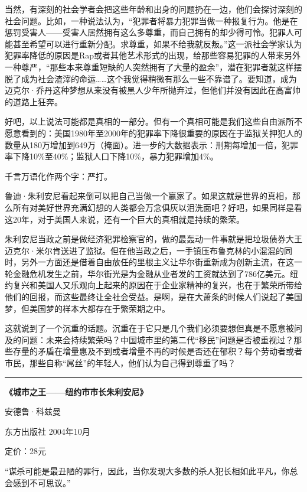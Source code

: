 当然，有深刻的社会学者会把这些年龄和出身的问题扔在一边，他们会探讨深刻的社会问题。比如，一种说法认为，``犯罪者将暴力犯罪当做一种报复行为。他是在惩罚受害人------受害人居然拥有这么多尊重，而自己拥有的却少得可怜。犯罪人可能甚至希望可以进行重新分配。求尊重，如果不给我就反叛。''这一派社会学家认为犯罪率降低的原因是Rap或者其他艺术形式的出现，给那些容易犯罪的人带来另外一种尊严，``那些本来尊重短缺的人突然拥有了大量的盈余''，潜在犯罪者就这样摆脱了成为社会渣滓的命运\ldots\ldots 这个我觉得稍微有那么一些不靠谱了。要知道，成为迈克尔·乔丹这种梦想从来没有被黑人少年所抛弃过，但他们并没有因此在高富帅的道路上狂奔。

好吧，以上说法可能都是真相的一部分。但有一个真相可能是我们这些自由派所不愿意看到的：美国1980年至2000年的犯罪率下降很重要的原因在于监狱关押犯人的数量从180万增加到649万（掩面）。进一步的大数据表示：刑期每增加一倍，犯罪率下降10\%至40\%；监狱人口下降10\%，暴力犯罪增加4\%。

千言万语化作两个字：严打。

鲁迪·朱利安尼看起来倒可以把自己当做一个赢家了。如果这就是世界的真相，那么所有对美好世界充满幻想的人类都会万念俱灰以泪洗面吧？好吧，如果同样是看这20年，对于美国人来说，还有一个巨大的真相就是持续的繁荣。

朱利安尼当政之前是做经济犯罪检察官的，做的最轰动一件事就是把垃圾债券大王迈克尔·米尔肯送进了监狱。但在他当政之后，一手镇压布鲁克林的小混混的同时，另外一方面还是借着自由放任的里根主义让华尔街重新成为创新主流，在这一轮金融危机发生之前，华尔街光是为金融从业者发的工资就达到了786亿美元。纽约复兴和美国人又乐观向上起来的原因在于企业家精神的复兴，也在于繁荣所带给他们的回报，而这些最终让全社会受益。是啊，是在大萧条的时候人们说起了美国梦，但美国梦的样本大都存在于繁荣期之中。

这就说到了一个沉重的话题。沉重在于它只是几个我们必须要想但真是不愿意被问及的问题：未来会持续繁荣吗？中国城市里的第二代``移民''问题是否被重视过？那些存量的矛盾在增量惠及不到或者增量不再的时候是否还在郁积？每个劳动者或者市民，那些自称``屌丝''的年轻人，他们认为自己得到尊重了吗？

\begin{center}\rule{0.5\linewidth}{0.5pt}\end{center}

\textbf{《城市之王------纽约市市长朱利安尼》}

安德鲁·科兹曼

东方出版社 2004年10月

定价：28元

``谋杀可能是最丑陋的罪行，因此，当你发现大多数的杀人犯长相如此平凡，你总会感到不可思议。''

